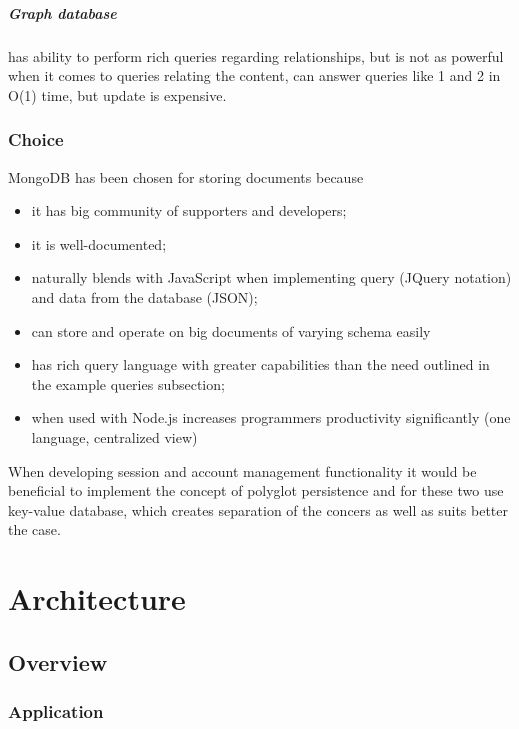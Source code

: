 \documentclass[a4paper]{tufte-book}
\begin{document}
\paragraph{Graph database} has ability to perform rich queries regarding relationships, but is not as powerful when it comes to queries relating the content, can answer queries like 1 and 2 in O(1) time, but update is expensive.

\subsection{Choice}
MongoDB has been chosen for storing documents because
\begin{itemize}
  \item it has big community of supporters and developers;
  \item it is well-documented;
  \item naturally blends with JavaScript when implementing query (JQuery notation) and data from the database (JSON);
  \item can store and operate on big documents of varying schema easily
  \item has rich query language with greater capabilities than the need outlined in the example queries subsection;
  \item when used with Node.js increases programmers productivity significantly (one language, centralized view)
\end{itemize}

When developing session and account management functionality it would be beneficial to implement the concept of polyglot persistence and for these two use key-value database, which creates separation of the concers as well as suits better the case.


\chapter{Architecture}

\section{Overview}

\subsection{Application}
\end{document}
